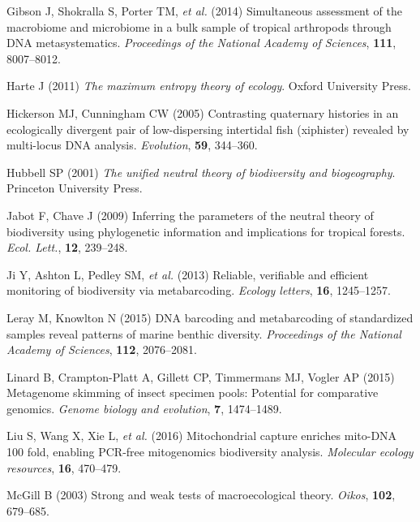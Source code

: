 \documentclass[
]{article}
\newlength{\cslhangindent}
\newlength{\cslentryspacingunit} %
\newenvironment{CSLReferences}[2] %
 {%
  \setlength{\parindent}{0pt}
  \ifodd #1
  \let\oldpar\par
  \def\par{\hangindent=\cslhangindent\oldpar}
  \fi
  \setlength{\parskip}{#2\cslentryspacingunit}
 }%
 {}
\begin{document}
\begin{CSLReferences}{1}{0}
\leavevmode{}%
Gibson J, Shokralla S, Porter TM, \emph{et al.} (2014) Simultaneous
assessment of the macrobiome and microbiome in a bulk sample of tropical
arthropods through DNA metasystematics. \emph{Proceedings of the
National Academy of Sciences}, \textbf{111}, 8007--8012.

\leavevmode{}%
Harte J (2011) \emph{The maximum entropy theory of ecology}. Oxford
University Press.

\leavevmode{}%
Hickerson MJ, Cunningham CW (2005) Contrasting quaternary histories in
an ecologically divergent pair of low-dispersing intertidal fish
(xiphister) revealed by multi-locus {DNA} analysis. \emph{Evolution},
\textbf{59}, 344--360.

\leavevmode{}%
Hubbell SP (2001) \emph{The unified neutral theory of biodiversity and
biogeography}. Princeton University Press.

\leavevmode{}%
Jabot F, Chave J (2009) Inferring the parameters of the neutral theory
of biodiversity using phylogenetic information and implications for
tropical forests. \emph{Ecol. Lett.}, \textbf{12}, 239--248.

\leavevmode{}%
Ji Y, Ashton L, Pedley SM, \emph{et al.} (2013) Reliable, verifiable and
efficient monitoring of biodiversity via metabarcoding. \emph{Ecology
letters}, \textbf{16}, 1245--1257.

\leavevmode{}%
Leray M, Knowlton N (2015) DNA barcoding and metabarcoding of
standardized samples reveal patterns of marine benthic diversity.
\emph{Proceedings of the National Academy of Sciences}, \textbf{112},
2076--2081.

\leavevmode{}%
Linard B, Crampton-Platt A, Gillett CP, Timmermans MJ, Vogler AP (2015)
Metagenome skimming of insect specimen pools: Potential for comparative
genomics. \emph{Genome biology and evolution}, \textbf{7}, 1474--1489.

\leavevmode{}%
Liu S, Wang X, Xie L, \emph{et al.} (2016) Mitochondrial capture
enriches mito-DNA 100 fold, enabling PCR-free mitogenomics biodiversity
analysis. \emph{Molecular ecology resources}, \textbf{16}, 470--479.

\leavevmode{}%
McGill B (2003) Strong and weak tests of macroecological theory.
\emph{Oikos}, \textbf{102}, 679--685.


\end{CSLReferences}
\end{document}
